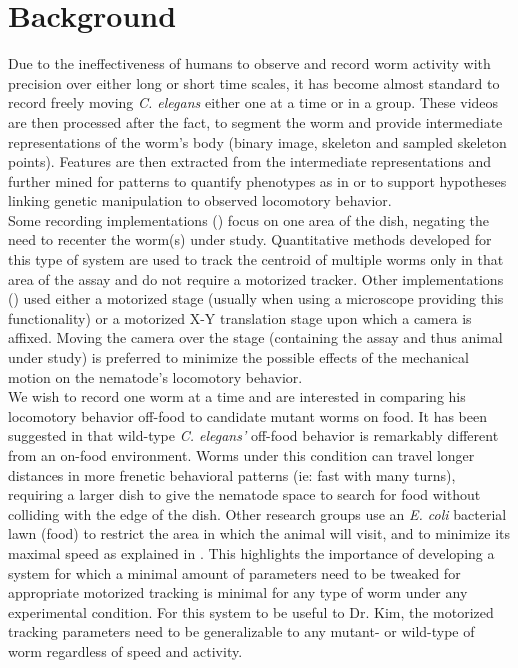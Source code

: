 \documentclass[main.tex]{subfiles}
\begin{document}
\section{Background}
Due to the ineffectiveness of humans to observe and record worm activity with precision over either long or short time scales, it has become almost standard to record freely moving \textit{C. elegans} either one at a time or in a group. These videos are then processed after the fact, to segment the worm and provide intermediate representations of the worm's body (binary image, skeleton and sampled skeleton points). Features are then extracted from the intermediate representations and further mined for patterns to quantify phenotypes as in \cite{yemini2013} or to support hypotheses linking genetic manipulation to observed locomotory behavior.\\ %

Some recording implementations (\cite{ramot2008, tsibidis2007}) focus on one area of the dish, negating the need to recenter the worm(s) under study. Quantitative methods developed for this type of system are used to track the centroid of multiple worms only in that area of the assay and do not require a motorized tracker. Other implementations (\cite{feng2004}) used either a motorized stage (usually when using a microscope providing this functionality) or a motorized X-Y translation stage upon which a camera is affixed. Moving the camera over the stage (containing the assay and thus animal under study) is preferred to minimize the possible effects of the mechanical motion on the nematode's locomotory behavior. \\

We wish to record one worm at a time and are interested in comparing his locomotory behavior off-food to candidate mutant worms on food. It has been suggested in \cite{gray2005} that wild-type \textit{C. elegans'} off-food behavior is remarkably different from an on-food environment. Worms under this condition can travel longer distances in more frenetic behavioral patterns (ie: fast with many turns), requiring a larger dish to give the nematode space to search for food without colliding with the edge of the dish. Other research groups use an \textit{E. coli} bacterial lawn (food) to restrict the area in which the animal will visit, and to minimize its maximal speed as explained in \cite{geng2004}. This highlights the importance of developing a system for which a minimal amount of parameters need to be tweaked for appropriate motorized tracking is minimal for any type of worm under any experimental condition. For this system to be useful to Dr. Kim, the motorized tracking parameters need to be generalizable to any mutant- or wild-type of worm regardless of speed and activity.\\
\end{document}

